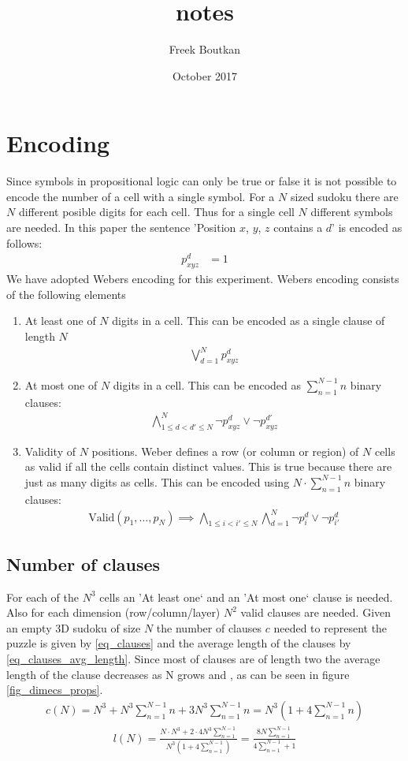\documentclass{article}
\title{notes}
\author{Freek Boutkan}
\date{October 2017}
\begin{document}
\section{Encoding}
Since symbols in propositional logic can only be true or false it is not possible to encode the number of a cell with a single symbol. For a $N$ sized sudoku there are $N$ different posible digits for each cell. Thus for a single cell $N$ different symbols are needed. In this paper the sentence 'Position $x$, $y$, $z$ contains a $d$' is encoded as follows:
\begin{align}
  p_{xyz}^d &= 1
\end{align}
We have adopted Webers \cite{weber2005sat} encoding for this experiment. Webers encoding consists of the following elements
\begin{enumerate}
  \item At least one of $N$ digits in a cell. This can be encoded as a single clause of length $N$
    \begin{align}
      \bigvee_{d=1}^N p_{xyz}^d
    \end{align}
  \item At most one of $N$ digits in a cell. This can be encoded as $\sum_{n=1}^{N-1}n$ binary clauses:
    \begin{align}
      \bigwedge_{1 \leq d < d' \leq N}^N \neg p_{xyz}^d \vee \neg p_{xyz}^{d'}
    \end{align}
  \item Validity of $N$ positions. Weber defines a row (or column or region) of $N$ cells as valid if all the cells contain distinct values. This is true because there are just as many digits as cells. This can be encoded using $N \cdot \sum_{n=1}^{N-1}n$ binary clauses:
    \begin{align}
      \text{Valid}(p_1,\dots,p_N) \implies \bigwedge_{1 \leq i < i' \leq N}\bigwedge_{d=1}^N \neg p_{i}^d \vee \neg p_{i'}^{d}
    \end{align}
\end{enumerate}

\subsection{Number of clauses}
For each of the $N^3$ cells an 'At least one` and an 'At most one` clause is needed. Also for each dimension (row/column/layer) $N^2$ valid clauses are needed. Given an empty 3D sudoku of size $N$ the number of clauses $c$ needed to represent the puzzle is given by \ref{eq_clauses} and the average length of the clauses by \ref{eq_clauses_avg_length}. Since most of clauses are of length two the average length of the clause decreases as N grows and , as can be seen in figure \ref{fig_dimecs_props}.
\begin{align}
  \label{eq_clauses}
  c(N) = N^3 + N^3 \sum_{n=1}^{N-1}n + 3N^3\sum_{n=1}^{N-1}n = N^3(1 + 4\sum_{n=1}^{N-1}n)
\end{align}
\begin{align}
  \label{eq_clauses_avg_length}
  l(N) = \frac{N\cdot N^3 + 2\cdot4 N^3 \sum_{n=1}^{N-1}}{N^3(1 + 4\sum_{n=1}^{N-1})} = \frac{8N\sum_{n=1}^{N-1}}{4\sum_{n=1}^{N-1}+1}
\end{align}
\end{document}

